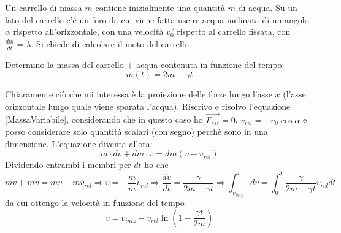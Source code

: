 \documentclass[../main.tex]{subfiles}
\begin{document}

\textex
Un carrello di massa $m$ contiene inizialmente una quantità $m$ di acqua.
Su un lato del carrello c'è un foro da cui viene fatta uscire acqua inclinata di un angolo $\alpha$ rispetto all'orizzontale, con una velocità $\overrightarrow {v_0}$ rispetto al carrello fissata, con $\frac{dm}{dt}=\lambda$.
Si chiede di calcolare il moto del carrello.


\solution
Determino la massa del carrello + acqua contenuta in funzione del tempo:
\begin{equation}\label{csa:MassaTempo}
m(t) = 2m-\gamma t
\end{equation}

Chiaramente ciò che mi interessa è la proiezione delle forze lungo l'asse $x$ (l'asse orizzontale lungo quale viene sparata l'acqua). Riscrivo e risolvo l'equazione \cref{MassaVariabile},  considerando che in questo caso ho $\overrightarrow{F_{est}}=0$,  $v_{rel} = -v_0\cos\alpha$ e posso considerare solo quantità scalari (con segno) perchè sono in una dimensione.
L'equazione diventa allora:
\begin{equation}
m\cdot dv + dm \cdot v = dm\left ( v - v_{rel}\right )
\end{equation}
Dividendo entrambi i membri per $dt$ ho che 
\begin{equation}
\dot m v + m\dot v = \dot m v - \dot m v_{rel}\Rightarrow \dot v = - \frac{\dot m}{m}v_{rel} \Rightarrow 
\frac{dv}{dt} = \frac{\gamma}{2m-\gamma t} \Rightarrow \int_{v_{iniz}}^{v} dv = \int_{0}^{t}\frac{\gamma}{2m-\gamma t}v_{rel}dt
\end{equation}
da cui ottengo la velocità in funzione del tempo
\begin{equation}
v = v_{iniz} -v_{rel}\ln \left ( 1-\frac{\gamma t}{2m}\right )
\end{equation}
\end{document}
